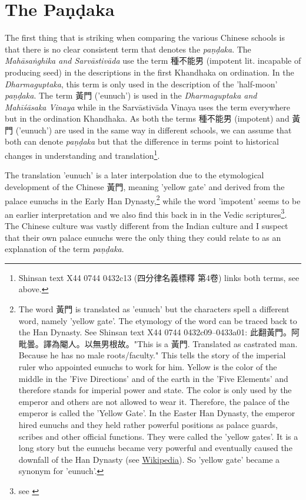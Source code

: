 \section{The Paṇḍaka}

The first thing that is striking when comparing the various Chinese schools is that there is no clear consistent term that denotes the {\em paṇḍaka}. The {\em Mahāsaṅghika and Sarvāstivāda} use the term 種不能男 (impotent lit. incapable of producing seed) in the descriptions in the first Khandhaka on ordination. In the {\em Dharmaguptaka}, this term is only used in the description of the 'half-moon' {\em paṇḍaka}. The term 黃門 ('eunuch') is used in the {\em Dharmaguptaka and Mahīśāsaka Vinaya} while in the Sarvāstivāda Vinaya uses the term everywhere but in the ordination Khandhaka. As both the terms 種不能男 (impotent) and 黃門 ('eunuch') are used in the same way in different schools, we can assume that both can denote {\em paṇḍaka} but that the difference in terms point to historical changes in understanding and translation\footnote{Shinsan text X44 0744 0432c13 (四分律名義標釋 第4卷) links both terms, see above.}.

The translation 'eunuch' is a later interpolation due to the etymological development of the Chinese 黃門, meaning 'yellow gate' and derived from the palace eunuchs in the Early Han Dynasty,\footnote{The word 黃門 is translated as 'eunuch' but the characters spell a different word, namely 'yellow gate'. The etymology of the word can be traced back to the Han Dynasty. See Shinsan text X44 0744 0432c09–0433a01: 此翻黃門。阿毗曇。譯為閹人。以無男根故。"This is a 黃門. Translated as castrated man. Because he has no male roots/faculty." This tells the story of the imperial ruler who appointed eunuchs to work for him. Yellow is the color of the middle in the 'Five Directions' and of the earth in the 'Five Elements' and therefore stands for imperial power and state. The color is only used by the emperor and others are not allowed to wear it. Therefore, the palace of the emperor is called the 'Yellow Gate'. In the Easter Han Dynasty, the emperor hired eunuchs and they held rather powerful positions as palace guards, scribes and other official functions. They were called the 'yellow gates'. It is a long story but the eunuchs became very powerful and eventually caused the downfall of the Han Dynasty (see \href{https://en.wikipedia.org/wiki/Han_dynasty}{Wikipedia}). So 'yellow gate' became a synonym for 'eunuch'.} while the word 'impotent' seems to be an earlier interpretation and we also find this back in in the Vedic scriptures\footnote{see \cite{zwilling}}. The Chinese culture was vastly different from the Indian culture and I suspect that their own palace eunuchs were the only thing they could relate to as an explanation of the term {\em paṇḍaka}.

